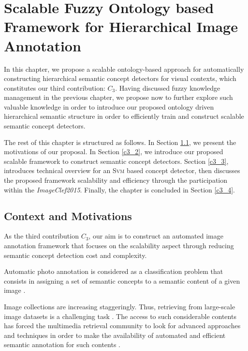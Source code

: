 \chapter{Scalable Fuzzy Ontology based Framework for Hierarchical Image Annotation}

	\label{c3}


	In this chapter, we propose a scalable ontology-based approach for automatically constructing  
	hierarchical semantic concept detectors for visual contexts, which constitutes our 
	third contribution: $C_{3}$. Having discussed fuzzy knowledge management in the previous chapter,
	we propose now to further explore such valuable knowledge in order to introduce our proposed 
	ontology driven hierarchical semantic structure in order to efficiently train and construct 
	scalable semantic concept detectors.

	The rest of this chapter is structured as follows. In Section \ref{c3_1}, we present the
	motivations of our proposal. In Section \ref{c3_2},
	we introduce our proposed scalable framework to construct semantic concept detectors. 
	Section \ref{c3_3}, introduces technical overview for an \textsc{Svm} based concept detector, then
	discusses the proposed framework scalability and efficiency through 
	the participation within the \textit{ImageClef2015}. Finally, the chapter is concluded in Section \ref{c3_4}.



	\section{Context and Motivations}
	\label{c3_1}

		As the third contribution $C_{3}$, our aim is to construct an automated 
		image annotation framework that focuses on the scalability aspect through 
		reducing semantic concept detection cost and complexity.

		Automatic photo annotation is considered as a classification problem that 
		consists in assigning a set of semantic concepts to a semantic content of
		a given image \citep{Snoek2009,Zhang2012,Piras2014}.

		Image collections are increasing staggeringly. Thus, retrieving from large-scale image 
		datasets is a challenging task \citep{Villegas2013,Villegas2014,Gilbert2015,Villegas2015}.
		The access to such considerable contents has forced the multimedia retrieval community 
		to look for advanced approaches and techniques in order to make the availability of automated 
		and efficient semantic annotation for such contents 
		\citep{Wang2011,Zhang2012,Benavent2013,Sahbi2013,Reshma2014}.

